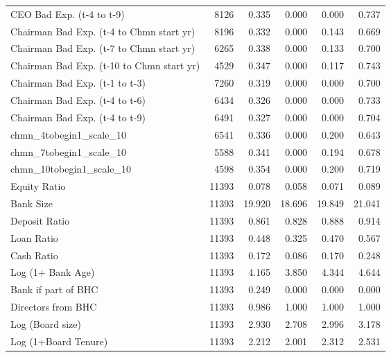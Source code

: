 \begin{longtable}{l*{1}{rrrrr}}
CEO Bad Exp. (t-4 to t-9)&        8126&       0.335&       0.000&       0.000&       0.737\\
Chairman Bad Exp. (t-4 to Chmn start yr)&        8196&       0.332&       0.000&       0.143&       0.669\\
Chairman Bad Exp. (t-7 to Chmn start yr)&        6265&       0.338&       0.000&       0.133&       0.700\\
Chairman Bad Exp. (t-10 to Chmn start yr)&        4529&       0.347&       0.000&       0.117&       0.743\\
Chairman Bad Exp. (t-1 to t-3)&        7260&       0.319&       0.000&       0.000&       0.700\\
Chairman Bad Exp. (t-4 to t-6)&        6434&       0.326&       0.000&       0.000&       0.733\\
Chairman Bad Exp. (t-4 to t-9)&        6491&       0.327&       0.000&       0.000&       0.704\\
chmn\_4tobegin1\_scale\_10&        6541&       0.336&       0.000&       0.200&       0.643\\
chmn\_7tobegin1\_scale\_10&        5588&       0.341&       0.000&       0.194&       0.678\\
chmn\_10tobegin1\_scale\_10&        4598&       0.354&       0.000&       0.200&       0.719\\
Equity Ratio        &       11393&       0.078&       0.058&       0.071&       0.089\\
Bank Size           &       11393&      19.920&      18.696&      19.849&      21.041\\
Deposit Ratio       &       11393&       0.861&       0.828&       0.888&       0.914\\
Loan Ratio          &       11393&       0.448&       0.325&       0.470&       0.567\\
Cash Ratio          &       11393&       0.172&       0.086&       0.170&       0.248\\
Log (1+ Bank Age)   &       11393&       4.165&       3.850&       4.344&       4.644\\
Bank if part of BHC &       11393&       0.249&       0.000&       0.000&       0.000\\
Directors from BHC  &       11393&       0.986&       1.000&       1.000&       1.000\\
Log (Board size)    &       11393&       2.930&       2.708&       2.996&       3.178\\
Log (1+Board Tenure)&       11393&       2.212&       2.001&       2.312&       2.531\\

\end{longtable}
